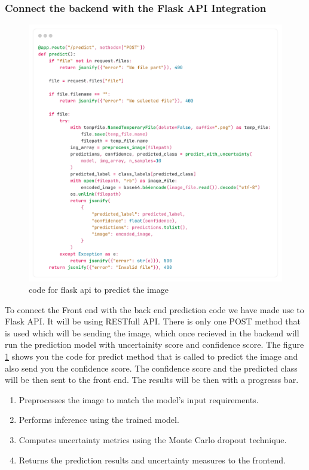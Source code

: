 \documentclass[12pt,onecolumn]{report}
\begin{document}
\subsubsection{Connect the backend with the Flask API Integration}
\begin{figure}[H]
    \centering
    \includegraphics[width=0.8\columnwidth]{figures/imp_flask.png}  %
    \caption{code for flask api to predict the image} %
    \label{fig:imp_flask} %
\end{figure}
To connect the Front end with the back end prediction code we have made use to Flask API. It will be using RESTfull API. There is only one POST method that is used which will be sending the image, which once recieved in the backend will run the prediction model with uncertainity score and confidence score. The figure \ref{fig:imp_flask} shows you the code for predict method that is called to predict the image and also send you the confidence score. The confidence score and the predicted class will be then sent to the front end. The results will be then with a progresss bar.
\begin{enumerate} 
    \item Preprocesses the image to match the model's input requirements.
    \item Performs inference using the trained model.
    \item Computes uncertainty metrics using the Monte Carlo dropout technique.
    \item Returns the prediction results and uncertainty measures to the frontend.
\end{enumerate}
\end{document}

